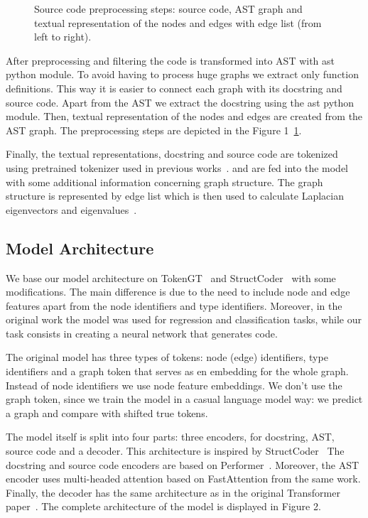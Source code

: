 \documentclass[sigplan,screen,anonymous,natbib=false]{acmart}
\begin{document}
\begin{figure}[!ht]
\begin{minipage}[l]{0.35\textwidth}
    \end{minipage}
    \caption{Source code preprocessing steps: source code, AST graph and textual representation of the nodes and edges with edge list (from left to right).}
    \label{fig:preprocessing-steps}
\end{figure}

After preprocessing and filtering the code is transformed into AST with ast python module.
To avoid having to process huge graphs we extract only function definitions.
This way it is easier to connect each graph with its docstring and source code.
Apart from the AST we extract the docstring using the ast python module.
Then, textual representation of the nodes and edges are created from the AST graph.
The preprocessing steps are depicted in the Figure 1~\ref{fig:preprocessing-steps}.

Finally, the textual representations, docstring and source code are tokenized using pretrained tokenizer used in previous works~\cite{black_gpt-neox-20b_2022,arutyunov_big_2022}.
and are fed into the model with some additional information concerning graph structure.
The graph structure is represented by edge list which is then used to calculate Laplacian eigenvectors and eigenvalues~\cite{kim_pure_2022}.

\subsection{Model Architecture}\label{subsec:model-architecture}

We base our model architecture on TokenGT~\cite{kim_pure_2022} and StructCoder~\cite{tipirneni_structcoder_2022} with some modifications.
The main difference is due to the need to include node and edge features apart from the node identifiers and type identifiers.
Moreover, in the original work the model was used for regression and classification tasks, while our task consists in creating a neural network that generates code.

The original model has three types of tokens: node (edge) identifiers, type identifiers and a graph token that serves as en embedding for the whole graph. 
Instead of node identifiers we use node feature embeddings.
We don't use the graph token, since we train the model in a casual language model way: we predict a graph and compare with shifted true tokens.

The model itself is split into four parts: three encoders, for docstring, AST, source code and a decoder.
This architecture is inspired by StructCoder~\cite{tipirneni_structcoder_2022}
The docstring and source code encoders are based on Performer~\cite{choromanski_rethinking_2020}.
Moreover, the AST encoder uses multi-headed attention based on FastAttention from the same work.
Finally, the decoder has the same architecture as in the original Transformer paper~\cite{vaswani_attention_2017}.
The complete architecture of the model is displayed in Figure 2.
\end{document}
